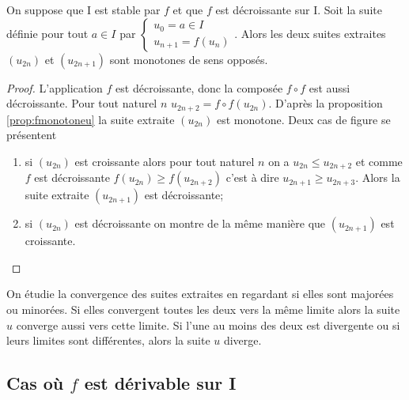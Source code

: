 \begin{prop}
  On suppose que I est stable par \(f\) et que \(f\) est décroissante sur I. Soit la suite définie pour tout \(a \in I\) par \(\begin{cases} u_0=a \in I \\ u_{n+1}=f(u_n) \end{cases}\). Alors les deux suites extraites \((u_{2n})\) et \((u_{2n+1})\) sont monotones de sens opposés.
\end{prop}
\begin{proof}
  L'application \(f\) est décroissante, donc la composée \(f \circ f\) est aussi décroissante. Pour tout naturel \(n\) \(u_{2n+2}=f \circ f(u_{2n})\). D'après la proposition~
\ref{prop:fmonotoneu} la suite extraite \((u_{2n})\) est monotone. Deux cas de figure se présentent
  \begin{enumerate}
  \item si \((u_{2n})\) est croissante alors pour tout naturel \(n\) on a \(u_{2n} \leqslant u_{2n+2}\) et comme \(f\) est décroissante \(f(u_{2n}) \geqslant f(u_{2n+2})\) c'est à dire \(u_{2n+1} \geqslant u_{2n+3}\). Alors la suite extraite \((u_{2n+1})\) est décroissante;
  \item si \((u_{2n})\) est décroissante on montre de la même manière que \((u_{2n+1})\) est croissante.
    \end{enumerate}
\end{proof}

On étudie la convergence des suites extraites en regardant si elles sont majorées ou minorées. Si elles convergent toutes les deux vers la même limite alors la suite \(u\) converge aussi vers cette limite. Si l'une au moins des deux est divergente ou si leurs limites sont différentes, alors la suite \(u\) diverge.

\subsection{Cas où \(f\) est dérivable sur I}

